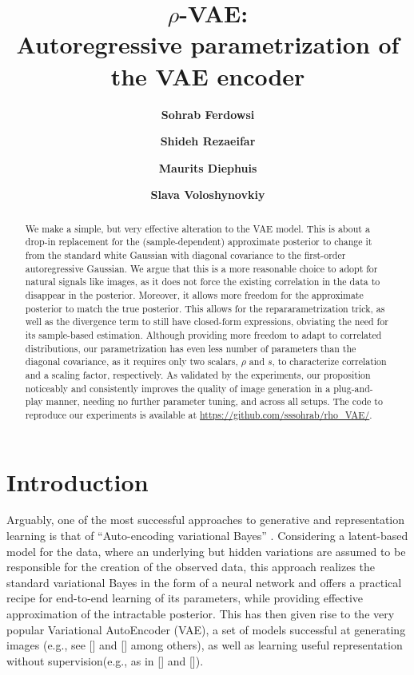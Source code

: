 \documentclass{article}
\title{$\rho$-VAE: \\Autoregressive parametrization of the VAE encoder}
\author{\textbf{Sohrab Ferdowsi}}
\author{\textbf{Shideh Rezaeifar}}
\author{\textbf{Maurits Diephuis}}
\author{\textbf{Slava Voloshynovkiy}}
\affil{
Department of Computer Science, University of Geneva, Switzerland \authorcr
  \{\tt sohrab.ferdowsi, shideh.rezaeifar, maurits.diephuis, svolos\}@unige.ch}
\begin{document}
\maketitle

\begin{abstract}


 
We make a simple, but very effective alteration to the VAE model. This is about a drop-in replacement for the (sample-dependent) approximate posterior to change it from the standard white Gaussian with diagonal covariance to the first-order autoregressive Gaussian. We argue that this is a more reasonable choice to adopt for natural signals like images, as it does not force the existing correlation in the data to disappear in the posterior. Moreover, it allows more freedom for the approximate posterior to match the true posterior. This allows for the repararametrization trick, as well as the divergence term to still have closed-form expressions, obviating the need for its sample-based estimation. Although providing more freedom to adapt to correlated distributions, our parametrization has even less number of parameters than the diagonal covariance, as it requires only two scalars, $\rho$ and $s$, to characterize correlation and a scaling factor, respectively. As validated by the experiments, our proposition noticeably and consistently improves the quality of image generation in a plug-and-play manner, needing no further parameter tuning, and across all setups. The code to reproduce our experiments is available at \url{https://github.com/sssohrab/rho_VAE/}.
 
\end{abstract}

\section{Introduction}
Arguably, one of the most successful approaches to generative and representation learning is that of ``Auto-encoding variational Bayes'' \cite{VAE}. Considering a latent-based model for the data, where an underlying but hidden variations are assumed to be responsible for the creation of the observed data, this approach realizes the standard variational Bayes in the form of a neural network and offers a practical recipe for end-to-end learning of its parameters, while providing effective approximation of the intractable posterior. This has then given rise to the very popular Variational AutoEncoder (VAE), a set of models successful at generating images (e.g., see [] and [] among others), as well as learning useful representation without supervision(e.g., as in [] and []).
\end{document}
